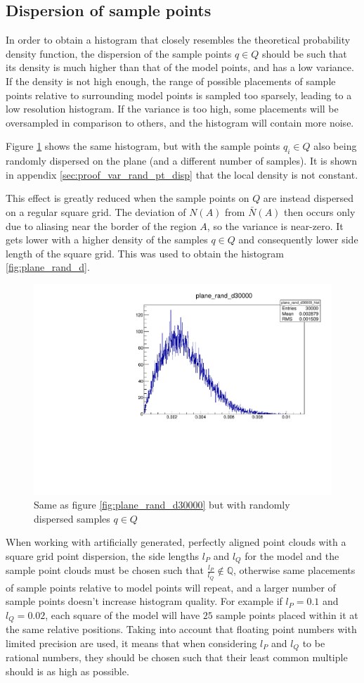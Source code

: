 \subsection{Dispersion of sample points}
In order to obtain a histogram that closely resembles the theoretical probability density function, the dispersion of the sample points $q \in Q$ should be such that its density is much higher than that of the model points, and has a low variance. If the density is not high enough, the range of possible placements of sample points relative to surrounding model points is sampled too sparsely, leading to a low resolution histogram. If the variance is too high, some placements will be oversampled in comparison to others, and the histogram will contain more noise.

Figure \ref{fig:plane_rand_d30000_randQ} shows the same histogram, but with the sample points $q_i \in Q$ also being randomly dispersed on the plane (and a different number of samples). It is shown in appendix \ref{sec:proof_var_rand_pt_disp} that the local density is not constant.

This effect is greatly reduced when the sample points on $Q$ are instead dispersed on a regular square grid. The deviation of $N(A)$ from $\bar{N}(A)$ then occurs only due to aliasing near the border of the region $A$, so the variance is near-zero. It gets lower with a higher density of the samples $q \in Q$ and consequently lower side length of the square grid. This was used to obtain the histogram \ref{fig:plane_rand_d}.

\begin{figure}[p]
\centering
\includegraphics[width=.6\textwidth]{fig/plane_rand_d30000.pdf}
\caption{Same as figure \ref{fig:plane_rand_d30000} but with randomly dispersed samples $q \in Q$}
\label{fig:plane_rand_d30000_randQ}
\end{figure}


When working with artificially generated, perfectly aligned point clouds with a square grid point dispersion, the side lengths $l_P$ and $l_Q$ for the model and the sample point clouds must be chosen such that $\frac{l_P}{l_Q} \notin \mathbb{Q}$, otherwise same placements of sample points relative to model points will repeat, and a larger number of sample points doesn't increase histogram quality. For example if $l_P = 0.1$ and $l_Q = 0.02$, each square of the model will have $25$ sample points placed within it at the same relative positions. Taking into account that floating point numbers with limited precision are used, it means that when considering $l_P$ and $l_Q$ to be rational numbers, they should be chosen such that their least common multiple should is as high as possible.


